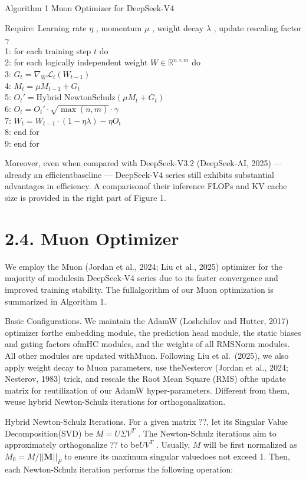 \documentclass[
  10
]{article}
\begin{document}
Algorithm 1 Muon Optimizer for DeepSeek-V4

Require: Learning rate \(\eta\) , momentum \(\mu\) , weight decay
\(\lambda\) , update rescaling factor \(\gamma\)\\
1: for each training step \(t\) do\\
2: for each logically independent weight
\(W \in \mathbb{R}^{n \times m}\) do\\
3: \(G_{t} = \nabla_{W} \mathcal{L}_{t}(W_{t-1})\)\\
4: \(M_{t} = \mu M_{t-1} + G_{t}\)\\
5: \(O_{t}' = \text{Hybrid NewtonSchulz}(\mu M_{t} + G_{t})\)\\
6: \(O_{t} = O_{t}' \cdot \sqrt{\max(n, m)} \cdot \gamma\)\\
7: \(W_{t} = W_{t-1} \cdot (1 - \eta \lambda) - \eta O_{t}\)\\
8: end for\\
9: end for

Moreover, even when compared with DeepSeek-V3.2 (DeepSeek-AI, 2025) ---
already an efficientbaseline --- DeepSeek-V4 series still exhibits
substantial advantages in efficiency. A comparisonof their inference
FLOPs and KV cache size is provided in the right part of Figure 1.

\section{2.4. Muon Optimizer}\label{muon-optimizer}

We employ the Muon (Jordan et al., 2024; Liu et al., 2025) optimizer for
the majority of modulesin DeepSeek-V4 series due to its faster
convergence and improved training stability. The fullalgorithm of our
Muon optimization is summarized in Algorithm 1.

Basic Configurations. We maintain the AdamW (Loshchilov and Hutter,
2017) optimizer forthe embedding module, the prediction head module, the
static biases and gating factors ofmHC modules, and the weights of all
RMSNorm modules. All other modules are updated withMuon. Following Liu
et al.~(2025), we also apply weight decay to Muon parameters, use
theNesterov (Jordan et al., 2024; Nesterov, 1983) trick, and rescale the
Root Mean Square (RMS) ofthe update matrix for reutilization of our
AdamW hyper-parameters. Different from them, weuse hybrid Newton-Schulz
iterations for orthogonalization.

Hybrid Newton-Schulz Iterations. For a given matrix ??, let its Singular
Value Decomposition(SVD) be \(M = U \Sigma V ^ { T }\) . The
Newton-Schulz iterations aim to approximately orthogonalize ?? to
be\(U V ^ { T }\) . Usually, \(M\) will be first normalized as
\(M _ { 0 } = M / | | \boldsymbol { M } | | _ { F }\) to ensure its
maximum singular valuedoes not exceed 1. Then, each Newton-Schulz
iteration performs the following operation:
\end{document}
